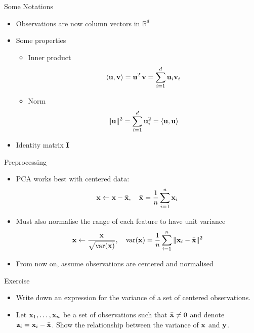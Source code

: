 \documentclass{beamer}
\begin{document}
\begin{frame}{Some Notations}
\begin{itemize} 
 \item Observations are now column vectors in $\mathbb{R}^d$
 \item Some properties 
 \begin{itemize}
 \item Inner product 
 \begin{displaymath} 
  \langle \textbf{u}, \textbf{v} \rangle = \textbf{u}^T\textbf{v} = \sum_{i=1}^d \textbf{u}_i \textbf{v}_i
 \end{displaymath}
 \item Norm 
 \begin{displaymath} 
  \|\textbf{u}\|^2 = \sum_{i=1}^d \textbf{u}_i^2 = \langle \textbf{u}, \textbf{u} \rangle
 \end{displaymath}
 \end{itemize} 
 \item Identity matrix $\textbf{I}$
\end{itemize}
\end{frame}


\begin{frame}{Preprocessing} 
\begin{itemize} 
 \item PCA works best with centered data: 
 \begin{displaymath} 
  \textbf{x} \leftarrow \textbf{x} - \bar{\textbf{x}}, \quad  \bar{\textbf{x}} = \frac{1}{n}\sum_{i=1}^n \textbf{x}_i
 \end{displaymath}
\item Must also normalise the range of each feature to have unit variance 
\begin{displaymath}
 \textbf{x} \leftarrow \frac{\textbf{x}}{\sqrt{\mbox{var}(\textbf{x})}}, \quad \mbox{var}(\textbf{x}) = \frac{1}{n}\sum_{i=1}^n \|\textbf{x}_i - \bar{\textbf{x}}\|^2
\end{displaymath}

\item From now on, assume observations are centered and normalised 
\end{itemize}
\end{frame}

\begin{frame}{Exercise}
\begin{itemize} 
 \item Write down an expression for the variance of a set of centered observations. 
 \item Let $\textbf{x}_1, \ldots, \textbf{x}_n$ be a set of observations such that $\bar{\textbf{x}} \neq 0$ and denote $\textbf{z}_i = \textbf{x}_i - \bar{\textbf{x}}$. Show the relationship between the variance of $\textbf{x}$ and $\textbf{y}$. 
\end{itemize}
 
\end{frame}
\end{document}

